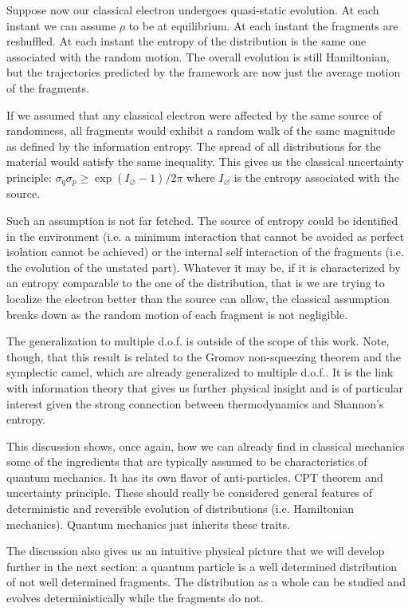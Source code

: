 \documentclass[smallextended]{svjour3}
\numberwithin{equation}{section}
\theoremstyle{definition}
\begin{document}
Suppose now our classical electron undergoes quasi-static evolution. At each instant we can assume $\rho$ to be at equilibrium. At each instant the fragments are reshuffled. At each instant the entropy of the distribution is the same one associated with the random motion. The overall evolution is still Hamiltonian, but the trajectories predicted by the framework are now just the average motion of the fragments. 

If we assumed that any classical electron were affected by the same source of randomness, all fragments would exhibit a random walk of the same magnitude as defined by the information entropy. The spread of all distributions for the material would satisfy the same inequality. This gives us the classical uncertainty principle: $\sigma_q\sigma_p \geq \exp (I_\varnothing - 1) / 2 \pi $ where $I_\varnothing$ is the entropy associated with the source.

Such an assumption is not far fetched. The source of entropy could be identified in the environment (i.e. a minimum interaction that cannot be avoided as perfect isolation cannot be achieved) or the internal self interaction of the fragments (i.e. the evolution of the unstated part). Whatever it may be, if it is characterized by an entropy comparable to the one of the distribution, that is we are trying to localize the electron better than the source can allow, the classical assumption breaks down as the random motion of each fragment is not negligible.

The generalization to multiple d.o.f. is outside of the scope of this work. Note, though, that this result is related to the Gromov non-squeezing theorem and the symplectic camel, which are already generalized to multiple d.o.f.. It is the link with information theory that gives us further physical insight and is of particular interest given the strong connection between thermodynamics and Shannon's entropy.

This discussion shows, once again, how we can already find in classical mechanics some of the ingredients that are typically assumed to be characteristics of quantum mechanics. It has its own flavor of anti-particles, CPT theorem and uncertainty principle. These should really be considered general features of deterministic and reversible evolution of distributions (i.e. Hamiltonian mechanics). Quantum mechanics just inherits these traits.

The discussion also gives us an intuitive physical picture that we will develop further in the next section: a quantum particle is a well determined distribution of not well determined fragments. The distribution as a whole can be studied and evolves deterministically while the fragments do not.
\end{document}
